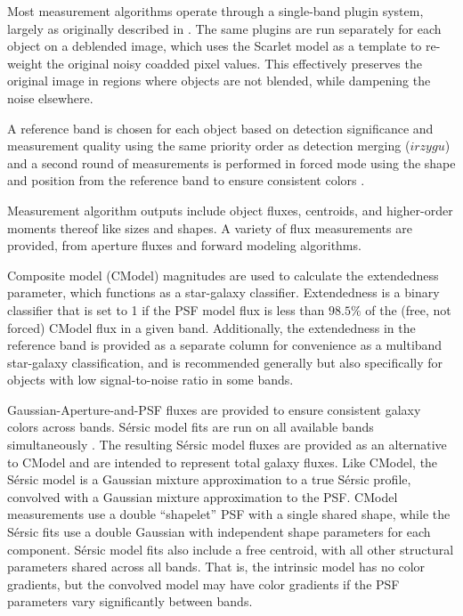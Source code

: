 Most measurement algorithms operate through a single-band plugin system, largely as originally described in \citet{2018PASJ...70S...5B}.
The same plugins are run separately for each object on a deblended image, which uses the Scarlet model as a template to re-weight the original noisy coadded pixel values.
This effectively preserves the original image in regions where objects are not blended, while dampening the noise elsewhere.

A reference band is chosen for each object based on detection significance and measurement quality using the same priority order as detection merging ($irzygu$) and a second round of measurements is performed in forced mode using the shape and position from the reference band to ensure consistent colors \citep{2018PASJ...70S...5B}.

Measurement \gls{algorithm} outputs include object fluxes, centroids, and higher-order moments thereof like sizes and shapes. A variety of \gls{flux} measurements are provided, from aperture fluxes and forward modeling algorithms.

Composite model (CModel) magnitudes \citep{2004AJ....128..502A, 2018PASJ...70S...5B} are used to calculate the extendedness parameter, which functions as a star-galaxy classifier.
Extendedness is a binary classifier that is set to 1 if the PSF model flux is less than $98.5\%$ of the (free, not forced) CModel flux in a given band.
Additionally, the extendedness in the reference band is provided as a separate column for convenience as a multiband star-galaxy classification, and is recommended generally but also specifically for objects with low signal-to-noise ratio in some bands.

Gaussian-Aperture-and-PSF \citep[\gls{GAaP}][]{2008A&A...482.1053K, DMTN-190} fluxes are provided to ensure consistent galaxy colors across bands.
S\'ersic model \citep{1963BAAA....6...41S, 1968adga.book.....S} fits are run on all available bands simultaneously \cite[MultiProFit,][]{dmtn-312}.
The resulting S\'ersic model fluxes are provided as an alternative to CModel and are intended to represent total galaxy fluxes.
Like CModel, the S\'ersic model is a Gaussian mixture approximation to a true S\'ersic profile, convolved with a Gaussian mixture approximation to the \gls{PSF}.
CModel measurements use a double ``shapelet'' \citep{2003ARA&A..41..645R} PSF with a single shared shape, while the S\'ersic fits use a double Gaussian with independent shape parameters for each component.
S\'ersic model fits also include a free centroid, with all other structural parameters shared across all bands.
That is, the intrinsic model has no color gradients, but the convolved model may have color gradients if the \gls{PSF} parameters vary significantly between bands.

